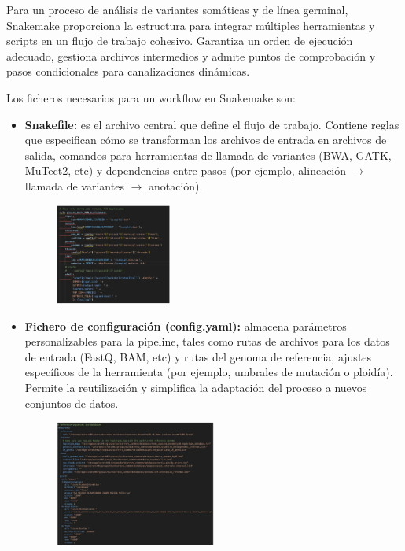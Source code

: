 Para un proceso de análisis de variantes somáticas y de línea germinal, Snakemake proporciona la estructura para integrar múltiples herramientas y scripts en un flujo de trabajo cohesivo.
Garantiza un orden de ejecución adecuado, gestiona archivos intermedios y admite puntos de comprobación y pasos condicionales para canalizaciones dinámicas.

Los ficheros necesarios para un workflow en Snakemake son:
\begin{itemize}
\item \textbf{Snakefile:} es el archivo central que define el flujo de trabajo. Contiene reglas que especifican cómo se transforman los archivos de entrada en archivos de salida, comandos para herramientas de llamada de variantes (BWA, GATK, MuTect2, etc) y dependencias entre pasos (por ejemplo, alineación $\rightarrow$ llamada de variantes $\rightarrow$ anotación).

\begin{figure}[h!]
\centering
\includegraphics[width = 0.36\textwidth]{figs/snakemake-rule.png}
\end{figure}

\item \textbf{Fichero de configuración (config.yaml):} almacena parámetros personalizables para la pipeline, tales como rutas de archivos para los datos de entrada (FastQ, BAM, etc) y rutas del genoma de referencia, ajustes específicos de la herramienta (por ejemplo, umbrales de mutación o ploidía). Permite la reutilización y simplifica la adaptación del proceso a nuevos conjuntos de datos.

\begin{figure}[htbp]
\centering
\includegraphics[width = 0.5\textwidth]{figs/snakemake-config.png}
\end{figure}


\end{itemize}
